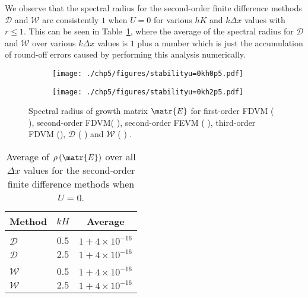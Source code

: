 We observe that the spectral radius for the second-order finite difference methods $\mathcal{D}$ and $\mathcal{W}$ are consistently $1$ when $U=0$ for various $hK$ and $k\Delta x$ values with $r \le 1$. This can be seen in Table~\ref{tab:Averageofspectralradiusu=0}, where the average of the spectral radius for $\mathcal{D}$ and $\mathcal{W}$ over various $k \Delta x$ values is $1$ plus a number which is just the accumulation of round-off errors caused by performing this analysis numerically.
%
\begin{figure}
	\centering
	\begin{subfigure}{0.5\textwidth}
		\texttt{[image: ./chp5/figures/stabilityu=0kh0p5.pdf]}
	\end{subfigure}%
	\begin{subfigure}{0.5\textwidth}
		\texttt{[image: ./chp5/figures/stabilityu=0kh2p5.pdf]}
	\end{subfigure}
	\caption{Spectral radius of growth matrix $\matr{E}$ for first-order FDVM ({\color{green!60!black} \solidrule}), second-order FDVM({\color{red} \solidrule}), second-order FEVM ({\color{blue} \solidrule}), third-order FDVM ({\solidrule}), $\mathcal{D}$ ({\color{violet!80!white} \solidrule}) and $\mathcal{W}$ ({\color{orange} \solidrule}) .}
	\label{fig:Stabu=0}
\end{figure}
%
\begin{table}
	\centering
	\begin{tabular}{l  c  c}
		\hline
		Method & $kH$& Average\\
		\hline && \\
		$\mathcal{D}$& $0.5$ & $1+ 4\times 10^{-16}$  \\
		$\mathcal{D}$& $2.5$ & $1+ 4\times 10^{-16}$  \\
		\hline \\
		$\mathcal{W}$& $0.5$ & $1+ 4\times 10^{-16}$  \\
		$\mathcal{W}$& $2.5$ & $1+ 4\times 10^{-16}$ \\
		\hline
	\end{tabular}
	\caption{Average of $\rho\left(\matr{E}\right)$ over all $\Delta x$ values for the second-order finite difference methods when $U=0$.}
	\label{tab:Averageofspectralradiusu=0}
\end{table}
